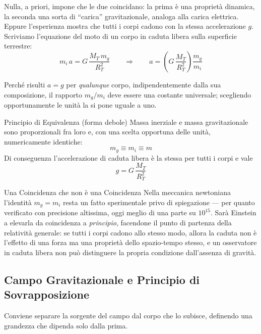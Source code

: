 Nulla, a priori, impone che le due coincidano: la prima è una proprietà dinamica, la seconda una sorta di ``carica'' gravitazionale, analoga alla carica elettrica. Eppure l'esperienza mostra che tutti i corpi cadono con la stessa accelerazione $g$. Scriviamo l'equazione del moto di un corpo in caduta libera sulla superficie terrestre:
\begin{equation}
    m_{i} \, a = G \, \frac{M_T \, m_{g}}{R_T^2}
    \qquad \Longrightarrow \qquad
    a = \left( G \, \frac{M_T}{R_T^2} \right) \frac{m_g}{m_i}
\end{equation}

Perché risulti $a = g$ per \emph{qualunque} corpo, indipendentemente dalla sua composizione, il rapporto $m_g/m_i$ deve essere una costante universale; scegliendo opportunamente le unità la si pone uguale a uno.

\begin{teorema}{Principio di Equivalenza (forma debole)}
Massa inerziale e massa gravitazionale sono proporzionali fra loro e, con una scelta opportuna delle unità, numericamente identiche:
\begin{equation}
    m_g \equiv m_i \equiv m
\end{equation}
Di conseguenza l'accelerazione di caduta libera è la stessa per tutti i corpi e vale
\begin{equation}
    g = G \, \frac{M_T}{R_T^2}
\end{equation}
\end{teorema}

\begin{osservazione}{Una Coincidenza che non è una Coincidenza}
Nella meccanica newtoniana l'identità $m_g = m_i$ resta un fatto sperimentale privo di spiegazione --- per quanto verificato con precisione altissima, oggi meglio di una parte su $10^{15}$. Sarà Einstein a elevarla da coincidenza a \emph{principio}, facendone il punto di partenza della relatività generale: se tutti i corpi cadono allo stesso modo, allora la caduta non è l'effetto di una forza ma una proprietà dello spazio-tempo stesso, e un osservatore in caduta libera non può distinguere la propria condizione dall'assenza di gravità.
\end{osservazione}

\subsection{Campo Gravitazionale e Principio di Sovrapposizione}

Conviene separare la sorgente del campo dal corpo che lo subisce, definendo una grandezza che dipenda solo dalla prima.


